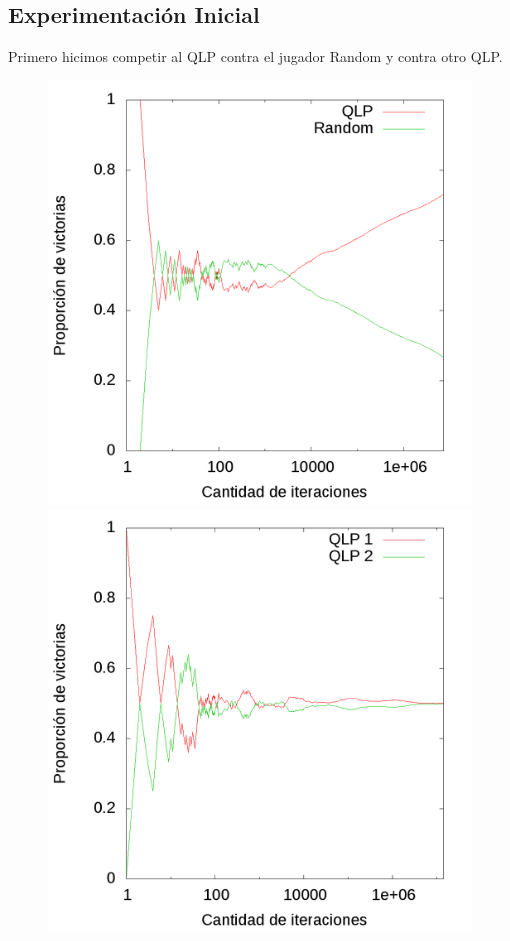 \documentclass[10pt, a4paper]{article}
\begin{document}
\subsection{Experimentación Inicial}

Primero hicimos competir al QLP contra el jugador Random y contra otro QLP.

\begin{figure}[ht]
  \begin{minipage}[c]{1\textwidth}
	\includegraphics[scale=0.32]{Initial/QvR.png}
	\includegraphics[scale=0.32]{Initial/QvQ.png}
  \end{minipage}
\end{figure}
\restoregeometry
\end{document}
